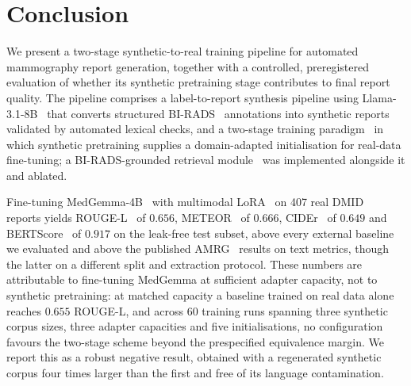 \documentclass{wlscirep}
\begin{document}
\section*{Conclusion}

We present a two-stage synthetic-to-real training pipeline for automated mammography report generation, together with a controlled, preregistered evaluation of whether its synthetic pretraining stage contributes to final report quality. The pipeline comprises a label-to-report synthesis pipeline using Llama-3.1-8B~\cite{dubey2024llama3} that converts structured BI-RADS~\cite{birads2013} annotations into synthetic reports validated by automated lexical checks, and a two-stage training paradigm~\cite{pan2010transfer} in which synthetic pretraining supplies a domain-adapted initialisation for real-data fine-tuning; a BI-RADS-grounded retrieval module~\cite{lewis2020rag} was implemented alongside it and ablated.

Fine-tuning MedGemma-4B~\cite{lin2024medgemma} with multimodal LoRA~\cite{hu2022lora} on 407 real DMID~\cite{oza2024} reports yields ROUGE-L~\cite{lin2004rouge} of $0.656$, METEOR~\cite{banerjee2005meteor} of $0.666$, CIDEr~\cite{vedantam2015cider} of $0.649$ and BERTScore~\cite{zhang2020bertscore} of $0.917$ on the leak-free test subset, above every external baseline we evaluated and above the published AMRG~\cite{sung2025} results on text metrics, though the latter on a different split and extraction protocol. These numbers are attributable to fine-tuning MedGemma at sufficient adapter capacity, not to synthetic pretraining: at matched capacity a baseline trained on real data alone reaches $0.655$ ROUGE-L, and across 60 training runs spanning three synthetic corpus sizes, three adapter capacities and five initialisations, no configuration favours the two-stage scheme beyond the prespecified equivalence margin. We report this as a robust negative result, obtained with a regenerated synthetic corpus four times larger than the first and free of its language contamination.
\end{document}
